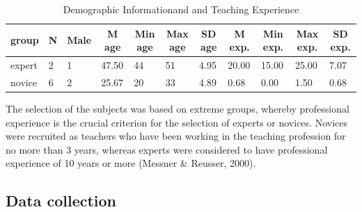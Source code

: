 \documentclass[
  english,
  man,floatsintext]{apa6}
\begin{document}
\begin{table}[h]

\begin{center}
\begin{threeparttable}

\caption{\label{tab:demographicspilottable}Demographic Informationand and Teaching Experience}

\small{

\begin{tabular}{lllllllllll}
\toprule
group & \multicolumn{1}{c}{N} & \multicolumn{1}{c}{Male} & \multicolumn{1}{c}{M age} & \multicolumn{1}{c}{Min age} & \multicolumn{1}{c}{Max age} & \multicolumn{1}{c}{SD age} & \multicolumn{1}{c}{M exp.} & \multicolumn{1}{c}{Min exp.} & \multicolumn{1}{c}{Max exp.} & \multicolumn{1}{c}{SD exp.}\\
\midrule
expert & 2 & 1 & 47.50 & 44 & 51 & 4.95 & 20.00 & 15.00 & 25.00 & 7.07\\
novice & 6 & 2 & 25.67 & 20 & 33 & 4.89 & 0.68 & 0.00 & 1.50 & 0.68\\
\bottomrule
\end{tabular}

}

\end{threeparttable}
\end{center}

\end{table}

The selection of the subjects was based on extreme groups, whereby professional experience is the crucial criterion for the selection of experts or novices. Novices were recruited as teachers who have been working in the teaching profession for no more than 3 years, whereas experts were considered to have professional experience of 10 years or more (Messner \& Reusser, 2000).

\hypertarget{data-collection}{%
\subsection{Data collection}\label{data-collection}}
\end{document}
